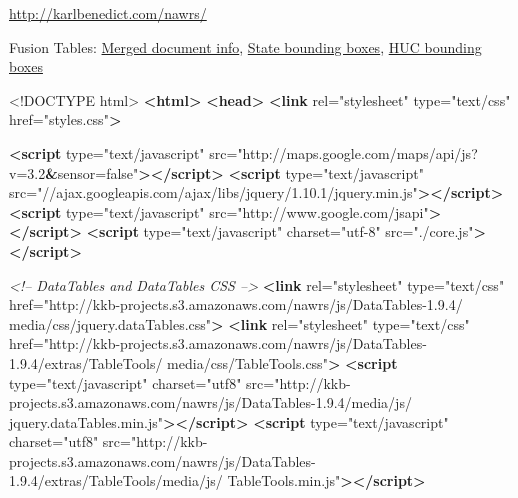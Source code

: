 \documentclass[]{article}
\newenvironment{Shaded}{}{}
\newcommand{\KeywordTok}[1]{\textcolor[rgb]{0.00,0.44,0.13}{\textbf{{#1}}}}
\newcommand{\DataTypeTok}[1]{\textcolor[rgb]{0.56,0.13,0.00}{{#1}}}
\newcommand{\StringTok}[1]{\textcolor[rgb]{0.25,0.44,0.63}{{#1}}}
\newcommand{\CommentTok}[1]{\textcolor[rgb]{0.38,0.63,0.69}{\textit{{#1}}}}
\newcommand{\OtherTok}[1]{\textcolor[rgb]{0.00,0.44,0.13}{{#1}}}
\newcommand{\ErrorTok}[1]{\textcolor[rgb]{1.00,0.00,0.00}{\textbf{{#1}}}}
\newcommand{\NormalTok}[1]{{#1}}
\begin{document}
\url{http://karlbenedict.com/nawrs/}

Fusion Tables: \href{http://tinyurl.com/npx2q6g}{Merged document info},
\href{http://tinyurl.com/qyy4kew}{State bounding boxes},
\href{http://tinyurl.com/or5xuxc}{HUC bounding boxes}

\begin{Shaded}
\begin{Highlighting}[numbers=left,,]
\DataTypeTok{<!DOCTYPE }\NormalTok{html}\DataTypeTok{>}
\KeywordTok{<html>}
\KeywordTok{<head>}
\KeywordTok{<link}\OtherTok{ rel=}\StringTok{"stylesheet"}\OtherTok{ type=}\StringTok{"text/css"}\OtherTok{ href=}\StringTok{"styles.css"}\KeywordTok{>}

\KeywordTok{<script}\OtherTok{ type=}\StringTok{"text/javascript"} 
\OtherTok{    src=}\StringTok{"http://maps.google.com/maps/api/js?v=3.2}\ErrorTok{&}\StringTok{sensor=false"}\KeywordTok{></script>}
\KeywordTok{<script}\OtherTok{ type=}\StringTok{"text/javascript"} 
\OtherTok{    src=}\StringTok{"//ajax.googleapis.com/ajax/libs/jquery/1.10.1/jquery.min.js"}\KeywordTok{></script>}
\KeywordTok{<script}\OtherTok{ type=}\StringTok{"text/javascript"}\OtherTok{ src=}\StringTok{"http://www.google.com/jsapi"}\KeywordTok{></script>}
\KeywordTok{<script}\OtherTok{ type=}\StringTok{"text/javascript"}\OtherTok{ charset=}\StringTok{"utf-8"}\OtherTok{ src=}\StringTok{"./core.js"}\KeywordTok{></script>}

\CommentTok{<!-- DataTables and DataTables CSS -->}
\KeywordTok{<link}\OtherTok{ rel=}\StringTok{"stylesheet"}\OtherTok{ type=}\StringTok{"text/css"} 
\OtherTok{  href=}\StringTok{"http://kkb-projects.s3.amazonaws.com/nawrs/js/DataTables-1.9.4/}
\StringTok{  media/css/jquery.dataTables.css"}\KeywordTok{>}
\KeywordTok{<link}\OtherTok{ rel=}\StringTok{"stylesheet"}\OtherTok{ type=}\StringTok{"text/css"} 
\OtherTok{  href=}\StringTok{"http://kkb-projects.s3.amazonaws.com/nawrs/js/DataTables-1.9.4/extras/TableTools/}
\StringTok{  media/css/TableTools.css"}\KeywordTok{>}
\KeywordTok{<script}\OtherTok{ type=}\StringTok{"text/javascript"}\OtherTok{ charset=}\StringTok{"utf8"} 
\OtherTok{  src=}\StringTok{"http://kkb-projects.s3.amazonaws.com/nawrs/js/DataTables-1.9.4/media/js/}
\StringTok{  jquery.dataTables.min.js"}\KeywordTok{></script>}
\KeywordTok{<script}\OtherTok{ type=}\StringTok{"text/javascript"}\OtherTok{ charset=}\StringTok{"utf8"} 
\OtherTok{  src=}\StringTok{"http://kkb-projects.s3.amazonaws.com/nawrs/js/DataTables-1.9.4/extras/TableTools/media/js/}
\StringTok{  TableTools.min.js"}\KeywordTok{></script>}


\end{Highlighting}
\end{Shaded}
\end{document}
